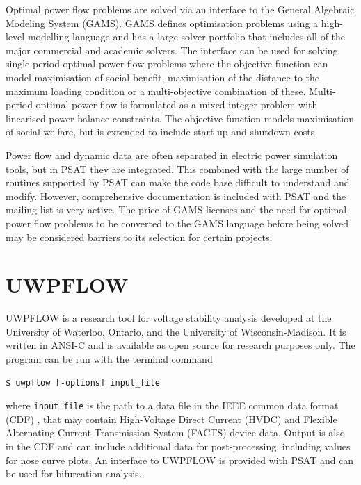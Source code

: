 Optimal power flow problems are solved via an interface to the General Algebraic
Modeling System (GAMS).  GAMS defines optimisation problems using a high-level
modelling language and has a large solver portfolio that includes all of the
major commercial and academic solvers.  The interface can be used for solving single
period optimal power flow problems where the objective function can model
maximisation of social benefit, maximisation of the distance to the maximum
loading condition or a multi-objective combination of these. Multi-period
optimal power flow is formulated as a mixed integer problem with linearised
power balance constraints.  The objective function models maximisation of social
welfare, but is extended to include start-up and shutdown costs.

Power flow and dynamic data are often separated in electric power
simulation tools, but in PSAT they are integrated.  This combined with the
large number of routines supported by PSAT can make the code base difficult to
understand and modify.  However, comprehensive documentation is included with
PSAT and the mailing list is very active.
The price of GAMS
licenses and the need for optimal power flow problems to be converted to the
GAMS language before being solved may be considered barriers to its
selection for certain projects.

\section{UWPFLOW}
UWPFLOW is a research tool for voltage stability analysis developed at the
University of Waterloo, Ontario, and the University of Wisconsin-Madison.  It
is written in ANSI-C and is available as open source for research purposes
only. The program can be run with the terminal command
\begin{center}
\begin{verbatim}
$ uwpflow [-options] input_file
\end{verbatim}
\end{center}
where \texttt{input\_file} is the path to a data file in the IEEE common data
format (CDF) \cite{cdf:73}, that may contain High-Voltage Direct Current (HVDC)
and Flexible Alternating Current Transmission System (FACTS) device data.
Output is also in the CDF and can include additional data for post-processing,
including values for nose curve plots.  An interface to UWPFLOW is provided
with PSAT and can be used for bifurcation analysis.

